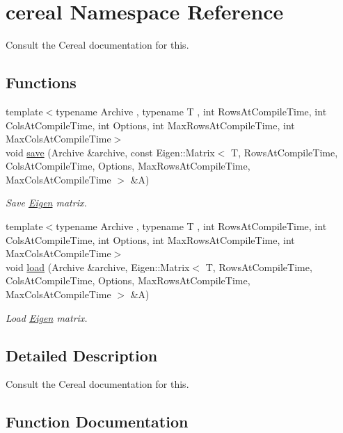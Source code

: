 \hypertarget{namespacecereal}{}\section{cereal Namespace Reference}
\label{namespacecereal}


Consult the Cereal documentation for this.  


\subsection*{Functions}
\begin{DoxyCompactItemize}
\item 
{\footnotesize template$<$typename Archive , typename T , int Rows\+At\+Compile\+Time, int Cols\+At\+Compile\+Time, int Options, int Max\+Rows\+At\+Compile\+Time, int Max\+Cols\+At\+Compile\+Time$>$ }\\void \hyperlink{namespacecereal_afd0f4831f36c8d183e4ff80c96b6b9ed}{save} (Archive \&archive, const Eigen\+::\+Matrix$<$ T, Rows\+At\+Compile\+Time, Cols\+At\+Compile\+Time, Options, Max\+Rows\+At\+Compile\+Time, Max\+Cols\+At\+Compile\+Time $>$ \&A)
\begin{DoxyCompactList}\small\item\em Save \hyperlink{namespaceEigen}{Eigen} matrix. \end{DoxyCompactList}\item 
{\footnotesize template$<$typename Archive , typename T , int Rows\+At\+Compile\+Time, int Cols\+At\+Compile\+Time, int Options, int Max\+Rows\+At\+Compile\+Time, int Max\+Cols\+At\+Compile\+Time$>$ }\\void \hyperlink{namespacecereal_a62dfe53ce43ad27c02ca954e9da31dc5}{load} (Archive \&archive, Eigen\+::\+Matrix$<$ T, Rows\+At\+Compile\+Time, Cols\+At\+Compile\+Time, Options, Max\+Rows\+At\+Compile\+Time, Max\+Cols\+At\+Compile\+Time $>$ \&A)
\begin{DoxyCompactList}\small\item\em Load \hyperlink{namespaceEigen}{Eigen} matrix. \end{DoxyCompactList}\end{DoxyCompactItemize}


\subsection{Detailed Description}
Consult the Cereal documentation for this. 

\subsection{Function Documentation}
\mbox{\label{namespacecereal_a62dfe53ce43ad27c02ca954e9da31dc5}} 
